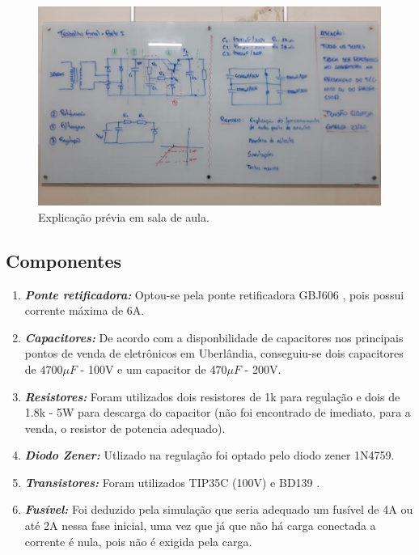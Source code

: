 \documentclass[a4paper,12pt,oneside,openany,table,xcdraw]{article}
\begin{document}
\begin{figure}[H]
\centering
\captionsetup{font=scriptsize}
\includegraphics[width=15cm]{quadro}
\caption{Explicação prévia em sala de aula.}
\label{quadro}
\end{figure}

\subsection{Componentes}
\begin{enumerate}[1 -]
    \item \textbf{\emph{Ponte retificadora:}} Optou-se pela ponte retificadora GBJ606 \cite{GBJ606}, pois possui corrente máxima de 6A.
    \item \textbf{\emph{Capacitores:}} De acordo com a disponbilidade de capacitores nos principais pontos de venda de eletrônicos em Uberlândia, conseguiu-se dois capacitores de $4700\mu F$ - 100V e um capacitor de $470\mu F$ - 200V.
    \item \textbf{\emph{Resistores:}} Foram utilizados dois resistores de 1k para regulação e dois de 1.8k - 5W para descarga do capacitor (não foi encontrado de imediato, para a venda, o resistor de potencia adequado).
    \item \textbf{\emph{Diodo Zener:}} Utlizado na regulação foi optado pelo diodo zener 1N4759.
    \item \textbf{\emph{Transistores:}} Foram utilizados TIP35C (100V) \cite{TIP35} e BD139 \cite{BD139}.
    \item \textbf{\emph{Fusível:}} Foi deduzido pela simulação que seria adequado um fusível de 4A ou até 2A nessa fase inicial, uma vez que já que não há carga conectada a corrente é nula, pois não é exigida pela carga. 

\end{enumerate}
\end{document}
